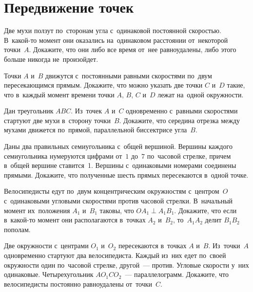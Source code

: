 
\section*{Передвижение точек}


\begin{problems}

\item
Две мухи ползут по~сторонам угла с~одинаковой постоянной скоростью.
В~какой-то момент они оказались на~одинаковом расстоянии от~некоторой
точки~$A$.
Докажите, что они либо все время от~нее равноудалены, либо этого больше никогда
не~произойдет.

\item
Точки $A$ и~$B$ движутся с~постоянными равными скоростями по~двум
пересекающимся прямым.
Докажите, что можно указать две точки $C$ и~$D$ такие, что в~каждый момент
времени точки $A$, $B$, $C$ и~$D$ лежат на~одной окружности.

\item
Дан треугольник $ABC$.
Из~точек $A$ и~$C$ одновременно с~равными скоростями стартуют две мухи
в~сторону точки~$B$.
Докажите, что середина отрезка между мухами движется по~прямой, параллельной
биссектрисе угла~$B$.

\item
Даны два правильных семиугольника с~общей вершиной.
Вершины каждого семиугольника нумеруются цифрами от~$1$ до~$7$ по~часовой
стрелке, причем в~общей вершине ставится~1.
Вершины с~одинаковыми номерами соединены прямыми.
Докажите, что полученные шесть прямых пересекаются в~одной точке.

\item
Велосипедисты едут по~двум концентрическим окружностям с~центром~$O$
с~одинаковыми угловыми скоростями против часовой стрелки.
В~начальный момент их~положения $A_1$  и~$B_1$ таковы, что
$O A_1 \perp A_1 B_1$.
Докажите, что если в~какой-то момент они располагаются в~точках $A_2$ и~$B_2$,
то~$A_1 A_2$ делит $B_1 B_2$ пополам.

\item
Две окружности с~центрами $O_1$ и~$O_2$ пересекаются в~точках $A$ и~$B$.
Из~точки~$A$ одновременно стартуют два велосипедиста.
Каждый из~них едет по~своей окружности один по~часовой стрелке, другой~---
против.
Угловые скорости у~них одинаковые.
Четырехугольник $A O_1 C O_2$~--- параллелограмм.
Докажите, что велосипедисты постоянно равноудалены от~точки~$C$.


\end{problems}
